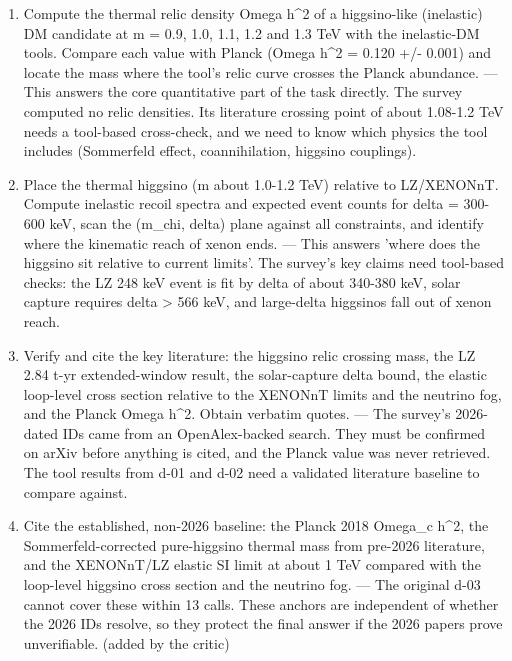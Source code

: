 \documentclass[11pt,a4paper]{article}
\begin{document}
\begin{enumerate}
  \item Compute the thermal relic density Omega h\textasciicircum{}2 of a higgsino-like (inelastic) DM candidate at m = 0.9, 1.0, 1.1, 1.2 and 1.3 TeV with the inelastic-DM tools. Compare each value with Planck (Omega h\textasciicircum{}2 = 0.120 +/- 0.001) and locate the mass where the tool's relic curve crosses the Planck abundance. --- This answers the core quantitative part of the task directly. The survey computed no relic densities. Its literature crossing point of about 1.08-1.2 TeV needs a tool-based cross-check, and we need to know which physics the tool includes (Sommerfeld effect, coannihilation, higgsino couplings).
  \item Place the thermal higgsino (m about 1.0-1.2 TeV) relative to LZ/XENONnT. Compute inelastic recoil spectra and expected event counts for delta = 300-600 keV, scan the (m\_chi, delta) plane against all constraints, and identify where the kinematic reach of xenon ends. --- This answers 'where does the higgsino sit relative to current limits'. The survey's key claims need tool-based checks: the LZ 248 keV event is fit by delta of about 340-380 keV, solar capture requires delta \textgreater{} 566 keV, and large-delta higgsinos fall out of xenon reach.
  \item Verify and cite the key literature: the higgsino relic crossing mass, the LZ 2.84 t-yr extended-window result, the solar-capture delta bound, the elastic loop-level cross section relative to the XENONnT limits and the neutrino fog, and the Planck Omega h\textasciicircum{}2. Obtain verbatim quotes. --- The survey's 2026-dated IDs came from an OpenAlex-backed search. They must be confirmed on arXiv before anything is cited, and the Planck value was never retrieved. The tool results from d-01 and d-02 need a validated literature baseline to compare against.
  \item Cite the established, non-2026 baseline: the Planck 2018 Omega\_c h\textasciicircum{}2, the Sommerfeld-corrected pure-higgsino thermal mass from pre-2026 literature, and the XENONnT/LZ elastic SI limit at about 1 TeV compared with the loop-level higgsino cross section and the neutrino fog. --- The original d-03 cannot cover these within 13 calls. These anchors are independent of whether the 2026 IDs resolve, so they protect the final answer if the 2026 papers prove unverifiable. (added by the critic)

\end{enumerate}
\end{document}
